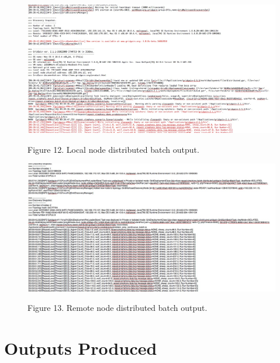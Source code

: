 \documentclass[12pt]{article}
\begin{document}
\begin{figure}[!t]
\begin{center}
\includegraphics [width=\textwidth]{images/Figure12.jpg}
\label{cablehealth}
\begin{minipage}{.9\textwidth}Figure 12. Local node distributed batch output.
\end{minipage}
\end{center}
\end{figure}

\begin{figure}[!t]
\begin{center}
\includegraphics [width=\textwidth]{images/Figure13.jpg}
\label{cablehealth}
\begin{minipage}{.9\textwidth}Figure 13. Remote node distributed batch output.
\end{minipage}
\end{center}
\end{figure}

\section{Outputs Produced}
\end{document}

